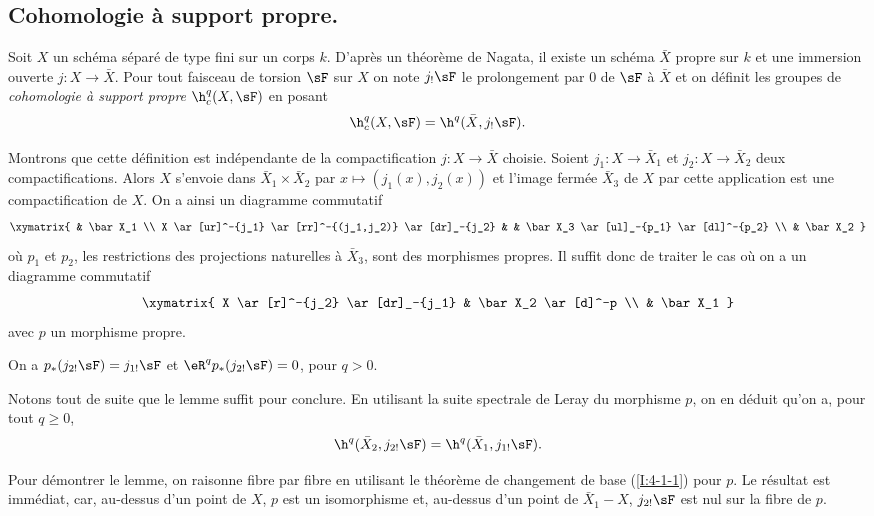 \subsection{Cohomologie à support propre.}\label{I:4-5}





\begin{definitiondotdash}\label{I:4-5-1}
Soit $X$ un schéma séparé de type fini sur un corps $k$. D'après un 
théorème de Nagata, il existe un schéma $\bar X$ propre sur $k$ et une 
immersion ouverte $j:X\to\bar X$. Pour tout faisceau de torsion $\sF$ sur $X$ on 
note $j_! \sF$ le prolongement par $0$ de $\sF$ à $\bar X$ et on définit les 
groupes de \emph{cohomologie à support propre} $\h_c^q(X,\sF)$ en posant 
\[
  \h_c^q(X,\sF)=\h^q(\bar X, j_! \sF) \text{.}
\]
\end{definitiondotdash}

Montrons que cette définition est indépendante de la compactification 
$j:X\to\bar X$ choisie. Soient $j_1:X\to \bar X_1$ et $j_2:X\to \bar X_2$ deux 
compactifications. Alors $X$ s'envoie dans $\bar X_1\times \bar X_2$ par 
$x\mapsto (j_1(x),j_2(x))$ et l'image fermée $\bar X_3$ de $X$ par cette 
application est une compactification de $X$. On a ainsi un diagramme commutatif 
\[\xymatrix{
  & \bar X_1 \\
  X \ar[ur]^-{j_1} \ar[rr]^-{(j_1,j_2)} \ar[dr]_-{j_2} 
    & & \bar X_3 \ar[ul]_-{p_1} \ar[dl]^-{p_2} \\
  & \bar X_2
}\]
où $p_1$ et $p_2$, les restrictions des projections naturelles à 
$\bar X_3$, sont des morphismes propres. Il suffit donc de traiter le cas où 
on a un diagramme commutatif 
\[\xymatrix{
  X \ar[r]^-{j_2} \ar[dr]_-{j_1} 
    & \bar X_2 \ar[d]^-p \\
  & \bar X_1
}\]
avec $p$ un morphisme propre. 





\begin{lemmadotdash}\label{I:4-5-2}
On a $p_*(j_{2!} \sF) = j_{1!} \sF$ et $\eR^q p_*(j_{2!} \sF) = 0$, pour $q>0$. 
\end{lemmadotdash}

Notons tout de suite que le lemme suffit pour conclure. En utilisant la suite 
spectrale de Leray du morphisme $p$, on en déduit qu'on a, pour tout 
$q\geqslant 0$, 
\[
  \h^q(\bar X_2, j_{2!} \sF) = \h^q(\bar X_1, j_{1!} \sF) \text{.}
\]

Pour démontrer le lemme, on raisonne fibre par fibre en utilisant le théorème 
de changement de base (\ref{I:4-1-1}) pour $p$. Le résultat est immédiat, car, 
au-dessus d'un point de $X$, $p$ est un isomorphisme et, au-dessus d'un point de 
$\bar X_1-X$, $j_{2!} \sF$ est nul sur la fibre de $p$. 





